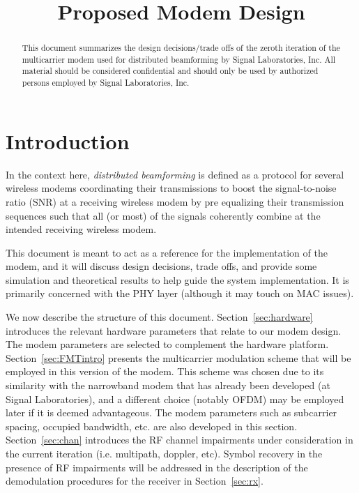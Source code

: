 \documentclass[conference]{IEEEtran}
\begin{document}
\title{Proposed Modem Design}
\author{
}

\maketitle

\begin{abstract}
This document summarizes the design decisions/trade offs of the zeroth
iteration of the multicarrier modem used for distributed beamforming by
Signal Laboratories, Inc. All material should be considered confidential
and should only be used by authorized persons employed by Signal
Laboratories, Inc.
\end{abstract}

\section{Introduction}
\label{sec:intro}

In the context here, \emph{distributed beamforming} is defined as a
protocol for several wireless modems coordinating their transmissions
to boost the signal-to-noise ratio (SNR) at a receiving wireless modem
by pre equalizing their transmission sequences such that all (or most)
of the signals coherently combine at the intended receiving wireless modem.

This document is meant to act as a reference for the implementation
of the modem, and it will discuss design decisions, trade offs, and
provide some simulation and theoretical results to help guide the
system implementation. It is primarily concerned with the PHY layer
(although it may touch on MAC issues).

We now describe the structure of this document. Section~\ref{sec:hardware}
introduces the relevant hardware parameters that relate to our modem
design. The modem parameters are selected to complement the hardware
platform. Section~\ref{sec:FMTintro} presents the multicarrier modulation
scheme that will be employed in this version of the modem. This scheme was
chosen due to its similarity with the narrowband modem that has already been
developed (at Signal Laboratories), and a different choice (notably OFDM)
may be employed later if it is deemed advantageous. The modem parameters
such as subcarrier spacing, occupied bandwidth, etc. are also developed
in this section. Section~\ref{sec:chan} introduces the RF channel
impairments under consideration in the current iteration (i.e. multipath,
doppler, etc). Symbol recovery in the presence of RF impairments will be
addressed in the description of the demodulation procedures for the
receiver in Section~\ref{sec:rx}.
\end{document}
